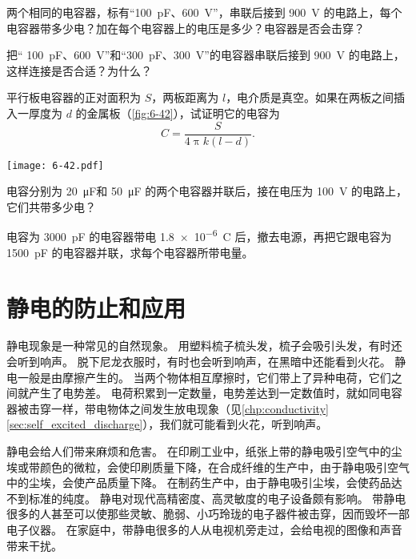 \begin{Practice}
\begin{question}
	\item 两个相同的电容器，标有“\qty{100}{\pico F}、\qty{600}{V}”，串联后接到 \qty{900}{V} 的电路上，每个电容器带多少电？加在每个电容器上的电压是多少？电容器是否会击穿？
	\item 把“ \qty{100}{\pico F}、\qty{600}{V}”和“\qty{300}{\pico F}、\qty{300}{V}”的电容器串联后接到 \qty{900}{V} 的电路上，这样连接是否合适？为什么？
	\item 平行板电容器的正对面积为 $S$，两板距离为 $l$，电介质是真空。如果在两板之间插入一厚度为 $d$ 的金属板（\cref{fig:6-42}），试证明它的电容为
	\[C=\frac{S}{4\uppi k(l-d)}.\]
	\begin{figurehere}
		\begin{minipage}{\linewidth}\centering
			\texttt{[image: 6-42.pdf]}
			\caption{}\label{fig:6-42}
		\end{minipage}
	\end{figurehere}
\item 电容分别为 \qty{20}{\micro F}和 \qty{50}{\micro F} 的两个电容器并联后，接在电压为 \qty{100}{V} 的电路上，它们共带多少电？
\item 电容为 \qty{3000}{\pico F} 的电容器带电 \qty{1.8e-6}{C} 后，撤去电源，再把它跟电容为 \qty{1500}{\pico F} 的电容器并联，求每个电容器所带电量。
\end{question}
\end{Practice}

\section{静电的防止和应用}
静电现象是一种常见的自然现象。
用塑料梳子梳头发，梳子会吸引头发，有时还会听到响声。
脱下尼龙衣服时，有时也会听到响声，在黑暗中还能看到火花。
静电一般是由摩擦产生的。
当两个物体相互摩擦时，它们带上了异种电荷，它们之间就产生了电势差。
电荷积累到一定数量，电势差达到一定数值时，就如同电容器被击穿一样，带电物体之间发生放电现象（见\cref{chp:conductivity}\cref{sec:self_excited_discharge}），我们就可能看到火花，听到响声。

静电会给人们带来麻烦和危害。
在印刷工业中，纸张上带的静电吸引空气中的尘埃或带颜色的微粒，会使印刷质量下降，在合成纤维的生产中，由于静电吸引空气中的尘埃，会使产品质量下降。
在制药生产中，由于静电吸引尘埃，会使药品达不到标准的纯度。
静电对现代高精密度、高灵敏度的电子设备颇有影响。
带静电很多的人甚至可以使那些灵敏、脆弱、小巧玲珑的电子器件被击穿，因而毁坏一部电子仪器。
在家庭中，带静电很多的人从电视机旁走过，会给电视的图像和声音带来干扰。

